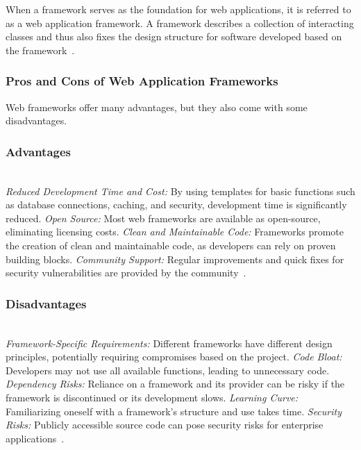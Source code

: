 \documentclass[conference]{IEEEtran}
\begin{document}
When a framework serves as the foundation for web applications, it is referred to as a web application framework. A framework describes a collection of interacting classes and thus also fixes the design structure for software developed based on the framework~\cite{ionos_webframeworks}.
\newline\subsubsection{Pros and Cons of Web Application Frameworks}
Web frameworks offer many advantages, but they also come with some disadvantages.
\newline\subsubsection{Advantages}
\textit{\\Reduced Development Time and Cost:} By using templates for basic functions such as database connections, caching, and security, development time is significantly reduced.
\newline\textit{Open Source:} Most web frameworks are available as open-source, eliminating licensing costs.
\newline\textit{Clean and Maintainable Code:} Frameworks promote the creation of clean and maintainable code, as developers can rely on proven building blocks.
\newline\textit{Community Support:} Regular improvements and quick fixes for security vulnerabilities are provided by the community~\cite{ionos_webframeworks}.
\newline
\subsubsection{Disadvantages}
\textit{\\Framework-Specific Requirements:} Different frameworks have different design principles, potentially requiring compromises based on the project.
\newline\textit{Code Bloat:} Developers may not use all available functions, leading to unnecessary code.
\newline\textit{Dependency Risks:} Reliance on a framework and its provider can be risky if the framework is discontinued or its development slows.
\newline\textit{Learning Curve:} Familiarizing oneself with a framework’s structure and use takes time.
\newline\textit{Security Risks:} Publicly accessible source code can pose security risks for enterprise applications~\cite{ionos_webframeworks}.
\newline
\end{document}
